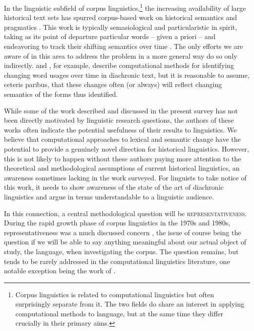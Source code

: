 \documentclass[output=paper]{langsci/langscibook}
\begin{document}
In the  linguistic subfield of corpus linguistics,\footnote{Corpus linguistics is related to computational linguistics but often surprisingly
separate from it. The two fields do share an interest in applying computational methods to language, but at the same time they differ crucially in their primary aims.} the
increasing availability of large historical text sets has spurred
corpus-based work on historical semantics and pragmatics
\citep{ihalainen-2006,taavitsainen-fitzmaurice-2007,allan-robinson-2011}. 
This
work is typically semasiological and particularistic in spirit, taking
as its point of departure particular words -- given a priori -- and
endeavoring to track their shifting semantics over time
\citep[e.g.,][]{sagi-etal-2011,kerremans-etal-2011}. The only efforts
we are aware of in this area to address the problem in a more general
way do so only indirectly. \citet{koplenig-2017} and \citet{degaetano2017diachronic}, for example, describe computational 
methods for identifying changing word usages over time in
diachronic text, but it
is reasonable to assume, ceteris paribus, that these changes often (or always) will
reflect changing semantics of the forms thus identified.

While some of the work described and discussed in the present survey
has not been directly motivated by linguistic research questions, the
authors of these works often indicate the potential usefulness of
their results to linguistics. We believe that computational approaches
to lexical and semantic change have the potential to provide a
genuinely novel direction for historical linguistics.  However, this
is not likely to happen without these authors paying more attention to
the theoretical and methodological assumptions of current historical
linguistics, an awareness sometimes lacking in the work surveyed. For
linguists to take notice of this work, it needs to show awareness of
the state of the art of diachronic linguistics and argue in terms
understandable to a linguistic audience.

In this connection, a central methodological question will be
\textsc{representativeness}. During the rapid growth phase of corpus linguistics in the 1970s and
1980s, representativeness was a much discussed concern
\citep[e.g.,][]{atkins-etal-1992,biber-1993,clear-1993,johansson-1994},
the issue of course being the question if we will be able to say anything meaningful about our actual object of study,
the language,  when investigating the
corpus. The question remains, but tends to be rarely addressed
in the computational linguistics literature, one notable exception being the work of \citet{koplenig2016,koplenig-2017}.
\end{document}
